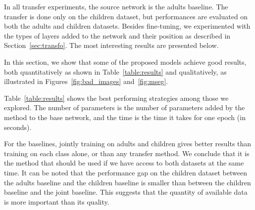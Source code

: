 

In all transfer experiments, the source network is the adults baseline. The transfer is done only on the children dataset, but performances are evaluated on both the adults and children datasets. Besides fine-tuning, we experimented with the types of layers added to the network and their position as described in Section~\ref{sec:transfo}. The most interesting results are presented below.

In this section, we show that some of the proposed models achieve good results, both quantitatively as shown in Table~\ref{table:results} and qualitatively, as illustrated in Figures~\ref{fig:bad_images} and~\ref{fig:mseg}.

Table~\ref{table:results} shows the best performing strategies among those we explored. 
The number of parameters is the number of parameters added by the method to the base network, and the time is the time it takes for one epoch (in seconds).

For the baselines, jointly training on adults and children gives better results than training on each class alone, or than any transfer method. We conclude that it is the method that should be used if we have access to both datasets at the same time. It can be noted that the performance gap on the children dataset between the adults baseline and the children baseline is smaller than between the children baseline and the joint baseline. This suggests that the quantity of available data is more important than its quality.


